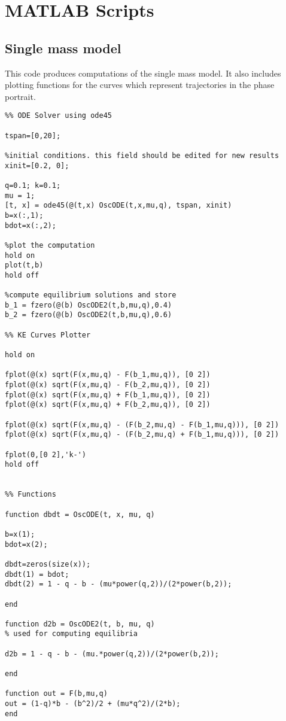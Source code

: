 \documentclass{report}
\begin{document}



\appendix


\chapter{MATLAB Scripts}

\section{Single mass model}

This code produces computations of the single mass model.
It also includes plotting functions for the curves which represent trajectories in the phase portrait.

\begin{verbatim}
%% ODE Solver using ode45

tspan=[0,20];

%initial conditions. this field should be edited for new results
xinit=[0.2, 0];

q=0.1; k=0.1;
mu = 1;
[t, x] = ode45(@(t,x) OscODE(t,x,mu,q), tspan, xinit)
b=x(:,1);
bdot=x(:,2);

%plot the computation
hold on
plot(t,b)
hold off

%compute equilibrium solutions and store
b_1 = fzero(@(b) OscODE2(t,b,mu,q),0.4)
b_2 = fzero(@(b) OscODE2(t,b,mu,q),0.6)

%% KE Curves Plotter

hold on

fplot(@(x) sqrt(F(x,mu,q) - F(b_1,mu,q)), [0 2])
fplot(@(x) sqrt(F(x,mu,q) - F(b_2,mu,q)), [0 2])
fplot(@(x) sqrt(F(x,mu,q) + F(b_1,mu,q)), [0 2])
fplot(@(x) sqrt(F(x,mu,q) + F(b_2,mu,q)), [0 2])

fplot(@(x) sqrt(F(x,mu,q) - (F(b_2,mu,q) - F(b_1,mu,q))), [0 2])
fplot(@(x) sqrt(F(x,mu,q) - (F(b_2,mu,q) + F(b_1,mu,q))), [0 2])

fplot(0,[0 2],'k-')
hold off


%% Functions

function dbdt = OscODE(t, x, mu, q)

b=x(1);
bdot=x(2);

dbdt=zeros(size(x));
dbdt(1) = bdot;
dbdt(2) = 1 - q - b - (mu*power(q,2))/(2*power(b,2));

end

function d2b = OscODE2(t, b, mu, q)
% used for computing equilibria

d2b = 1 - q - b - (mu.*power(q,2))/(2*power(b,2));

end

function out = F(b,mu,q)
out = (1-q)*b - (b^2)/2 + (mu*q^2)/(2*b);
end
\end{verbatim}
\end{document}
